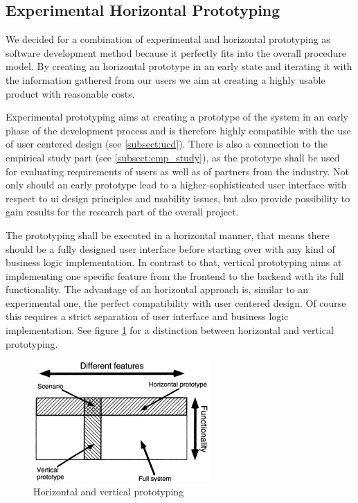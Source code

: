 \documentclass[a4paper,11pt]{article}
\begin{document}
\subsection{Experimental Horizontal Prototyping}
We decided for a combination of experimental and horizontal prototyping as software development method because it perfectly fits into the overall procedure model. By creating an horizontal prototype in an early state and iterating it with the information gathered from our users we aim at creating a highly usable product with reasonable costs.

Experimental prototyping aims at creating a prototype of the system in an early phase of the development process and is therefore highly compatible with the use of user centered design (see \ref{subsect:ucd}).
There is also a connection to the empirical study part (see \ref{subsect:emp_study}), as the prototype shall be used for evaluating requirements of users as well as of partners from the industry. Not only should an early prototype lead to a higher-sophisticated user interface with respect to ui design principles and usability issues, but also provide possibility to gain results for the research part of the overall project. 

The prototyping shall be executed in a horizontal manner, that means there should be a fully designed user interface before starting over with any kind of business logic implementation. In contrast to that, vertical prototyping aims at implementing one specific feature from the frontend to the backend with its full functionality. The advantage of an horizontal approach is, similar to an experimental one, the perfect compatibility with user centered design. Of course this requires a strict separation of user interface and business logic implementation. See figure \ref{fig:prototyping} for a distinction between horizontal and vertical prototyping.

\begin{figure}[htb]
	\centering
		\includegraphics[width=0.6\textwidth]{images/method/prototyping}
	\caption{Horizontal and vertical prototyping \citep[Page 94]{nielsen1994}}
	\label{fig:prototyping}
\end{figure}
\end{document}
